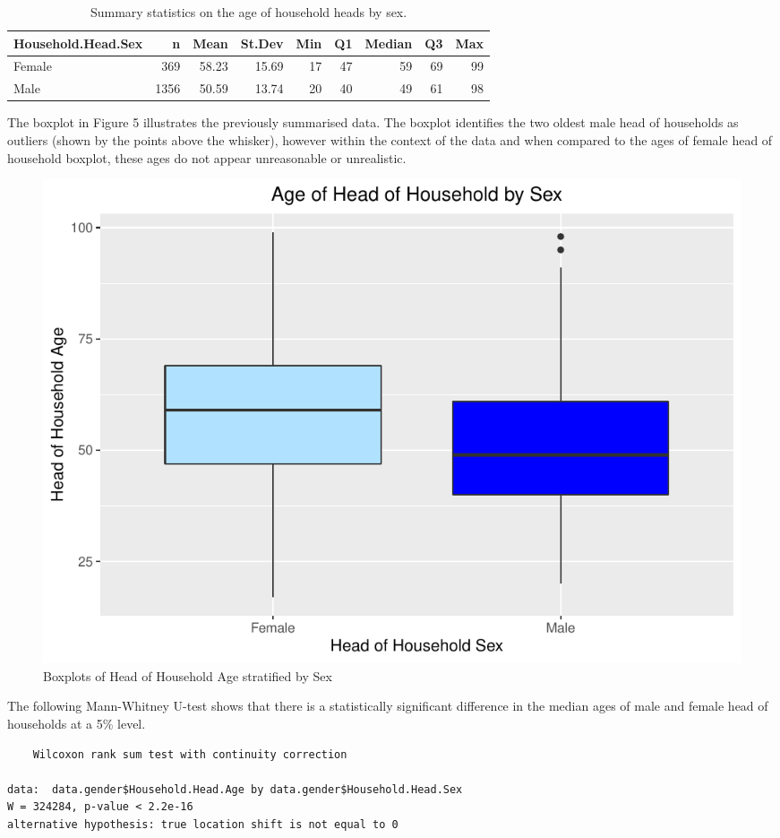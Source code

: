 \documentclass[
]{article}
\begin{document}
\begin{table}[!h]

\caption{\label{tab:summaries of age by sex}Summary statistics on the age of household heads by sex.}
\centering
\begin{tabular}[t]{l|r|r|r|r|r|r|r|r}
\hline
Household.Head.Sex & n & Mean & St.Dev & Min & Q1 & Median & Q3 & Max\\
\hline
Female & 369 & 58.23 & 15.69 & 17 & 47 & 59 & 69 & 99\\
\hline
Male & 1356 & 50.59 & 13.74 & 20 & 40 & 49 & 61 & 98\\
\hline
\end{tabular}
\end{table}

The boxplot in Figure 5 illustrates the previously summarised data. The
boxplot identifies the two oldest male head of households as outliers
(shown by the points above the whisker), however within the context of
the data and when compared to the ages of female head of household
boxplot, these ages do not appear unreasonable or unrealistic.

\begin{figure}

{\centering \includegraphics[width=0.8\linewidth]{Group_01_Project2_demo_files/figure-latex/boxplot of age by gender-1} 

}

\caption{Boxplots of Head of Household Age stratified by Sex}\label{fig:boxplot of age by gender}
\end{figure}

The following Mann-Whitney U-test shows that there is a statistically
significant difference in the median ages of male and female head of
households at a 5\% level.

\begin{verbatim}
    Wilcoxon rank sum test with continuity correction

data:  data.gender$Household.Head.Age by data.gender$Household.Head.Sex
W = 324284, p-value < 2.2e-16
alternative hypothesis: true location shift is not equal to 0
\end{verbatim}
\end{document}
